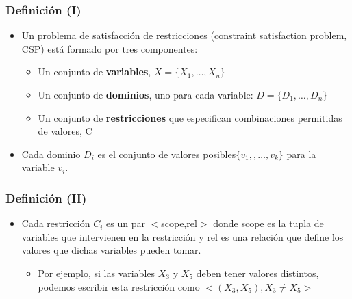 \documentclass[xcolor=table]{beamer}
\begin{document}
\begin{frame}  \frametitle{Definición (I)} \footnotesize

\begin{itemize}
\item Un problema de satisfacción de restricciones (constraint satisfaction problem, CSP) está formado por tres componentes:

\begin{itemize}
\item Un conjunto de \textbf{variables}, $X=\{X_1,\ldots ,X_n\}$
\item Un conjunto de \textbf{dominios}, uno para cada variable: $D=\{D_1,\ldots , D_n\}$
\item Un conjunto de \textbf{restricciones} que especifican combinaciones permitidas de valores, C
\end{itemize}

\item Cada dominio $D_i$ es el conjunto de valores posibles$ \{v_1,,\ldots, v_k\}$ para la variable $v_i$.
\end{itemize}

\end{frame} 


\begin{frame}  \frametitle{Definición (II)} \footnotesize

\begin{itemize}
\item Cada restricción $C_i$ es un par $<$scope,rel$>$ donde scope es la tupla de variables que intervienen en la restricción y rel es una relación que define los valores que dichas variables pueden tomar.

\begin{itemize}
\item Por ejemplo, si las variables $X_3$ y $X_5$ deben tener valores distintos, podemos escribir esta restricción como $< (X_3,X_5), X_3 \neq X_5 >$

\end{itemize}

\end{itemize}

\end{frame} 

\end{document}
